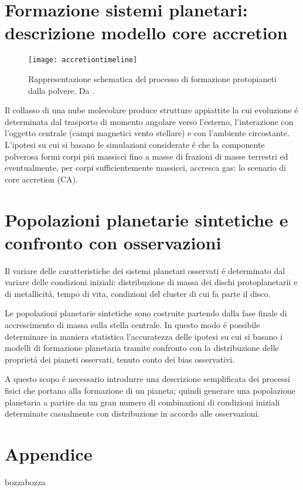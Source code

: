 \documentclass[twoside,11pt,fleqn]{memoir}%
\def\versione{bozza}%
\def\bozza{bozza}
\begin{document}
{\let\clearpage\relax\let\cleardoublepage\relax
\part{Formazione sistemi planetari: descrizione modello core accretion}\label{part:CAdesc}
}
\begin{figure}[!ht]
\texttt{[image: accretiontimeline]}\caption{Rappresentazione schematica del processo di formazione protopianeti dalla polvere. Da \cite{perryman2011exoplanet}.}\label{fig:accretiontimeline}
\end{figure}
Il collasso di una nube molecolare produce strutture appiattite la cui evoluzione \'e determinata dal trasporto di momento angolare verso l'esterno, l'interazione con l'oggetto centrale (campi magnetici vento stellare) e con l'ambiente circostante.
L'ipotesi su cui si basano le simulazioni considerate \'e che la componente polverosa formi corpi pi\'u massicci fino a masse di frazioni di masse terrestri  ed eventualmente, per corpi sufficientemente massicci, accresca gas: lo scenario di core accretion (CA).

\cleartorecto

{\let\clearpage\relax\let\cleardoublepage\relax
\part{Popolazioni planetarie sintetiche e confronto con osservazioni}
}


\begin{errata}
Il variare delle caratteristiche dei sistemi planetari osservati \'e determinato dal variare delle condizioni iniziali: distribuzione di massa dei dischi protoplanetarii e di metallicit\'a, tempo di vita, condizioni del cluster di cui fa parte il disco.
\end{errata}

Le popolazioni planetarie sintetiche sono costruite partendo dalla fase finale di accrescimento di massa sulla stella centrale. In questo modo \'e possibile determinare in maniera statistica l'accuratezza delle ipotesi su cui si basano i modelli di formazione planetaria tramite confronto con la distribuzione delle propriet\'a dei pianeti osservati, tenuto conto dei bias osservativi.

A questo scopo  \'e necessario introdurre una descrizione semplificata dei processi fisici che portano alla formazione di un pianeta; quindi generare una popolazione planetaria a partire da un gran numero di combinazioni di condizioni iniziali determinate casualmente con distribuzione in accordo alle osservazioni.


\cleartorecto



{\let\clearpage\relax\let\cleardoublepage\relax
\backmatter
}

\appendix
\part{Appendice}

\printbibliography
\ifx\versione\bozza
\woc
\erratac
\fi
\end{document}
